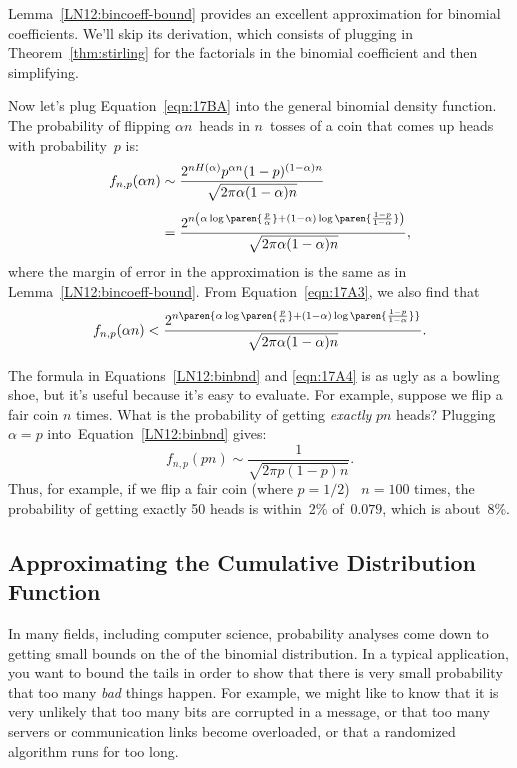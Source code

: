 Lemma~\eqref{LN12:bincoeff-bound} provides an excellent approximation
for binomial coefficients.  We'll skip its derivation, which consists
of plugging in Theorem~\ref{thm:stirling} for the factorials in the
binomial coefficient and then simplifying.

Now let's plug Equation~\ref{eqn:17BA} into the general binomial density
function.  The probability of flipping $\alpha n$~heads in $n$~tosses
of a coin that comes up heads with probability~$p$ is:
\begin{align}
f_{n, p}(\alpha n)
    &\sim \frac{ 2^{n H(\alpha)} p^{\alpha n} (1 - p)^{(1 - \alpha)n} }
            { \sqrt{2 \pi \alpha (1 - \alpha) n} } \notag\\[4pt]
    &= \frac{ 2^{n \left(\alpha \log\paren{\frac{p}{\alpha}}
                    + (1 - \alpha) \log\paren{\frac{1 - p}{1 - \alpha}}\right)} 
            }
            { \sqrt{2 \pi \alpha (1 - \alpha) n} }, \label{LN12:binbnd}
\end{align}
where the margin of error in the approximation is the same as in
Lemma~\ref{LN12:bincoeff-bound}.  From Equation~\ref{eqn:17A3}, we
also find that
\begin{equation}\label{eqn:17A4}
    f_{n, p}(\alpha n) < \frac{ 2^{n \paren{\alpha
        \log\paren{\frac{p}{\alpha}} + (1 - \alpha) \log\paren{\frac{1
          - p}{1 - \alpha}}}} }
                              { \sqrt{2 \pi \alpha (1 - \alpha) n} }.
\end{equation}

The formula in Equations~\ref{LN12:binbnd} and \ref{eqn:17A4} is as
ugly as a bowling shoe, but it's useful because it's easy to evaluate.
For example, suppose we flip a fair coin $n$ times.  What is the
probability of getting \emph{exactly} $pn$ heads?  Plugging $\alpha =
p$ into~Equation~\ref{LN12:binbnd} gives:
%
\begin{equation*}
f_{n, p}(pn)
    \sim \frac{1}{\sqrt{2 \pi p (1 - p) n} }.
\end{equation*}
%
Thus, for example, if we flip a fair coin (where $p = 1/2$) \ $n =
100$ times, the probability of getting exactly 50 heads is within~2\%
of~$0.079$, which is about~8\%.

\subsection{Approximating the Cumulative Distribution Function}

In many fields, including computer science, probability analyses come
down to getting small bounds on the  of the binomial
distribution.  In a typical application, you want to bound the tails
in order to show that there is very small probability that too many
\emph{bad} things happen.  For example, we might like to know that it
is very unlikely that too many bits are corrupted in a message, or
that too many servers or communication links become overloaded, or
that a randomized algorithm runs for too long.

